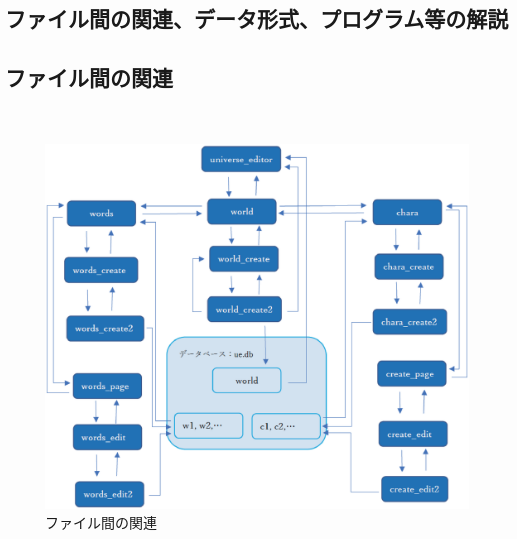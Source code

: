 \documentclass[12pt,a4paper]{jarticle}
\begin{document}
\begin{ttfamily}
\newpage
\section{ファイル間の関連、データ形式、プログラム等の解説}
\subsection{ファイル間の関連}
 \ \\
\begin{figure}[h]
  \includegraphics[width = 180mm]{10-2.eps}
  \centering
  \caption{ファイル間の関連}
\end{figure}
 \ \\

\end{ttfamily}
\end{document}
